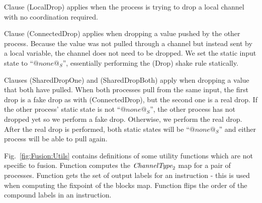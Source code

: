 Clause (LocalDrop) applies when the process is trying to drop a local channel with no coordination required.

Clause (ConnectedDrop) applies when dropping a value pushed by the other process.
Because the value was not pulled through a channel but instead sent by a local variable, the channel does not need to be dropped.
We set the static input state to ``$@none@_S$'', essentially performing the (Drop) shake rule statically.

Clauses (SharedDropOne) and (SharedDropBoth) apply when dropping a value that both have pulled.
When both processes pull from the same input, the first drop is a fake drop as with (ConnectedDrop), but the second one is a real drop.
If the other process' static state is not ``$@none@_S$'', the other process has not dropped yet so we perform a fake drop.
Otherwise, we perform the real drop.
After the real drop is performed, both static states will be ``$@none@_S$'' and either process will be able to pull again.



Fig.~\ref{fig:Fusion:Utils} contains definitions of some utility functions which are not specific to fusion.
Function  computes the $\textit{ChannelType}_2$ map for a pair of processes.
Function  gets the set of output labels for an instruction - this is used when computing the fixpoint of the blocks map.
Function  flips the order of the compound labels in an instruction.
